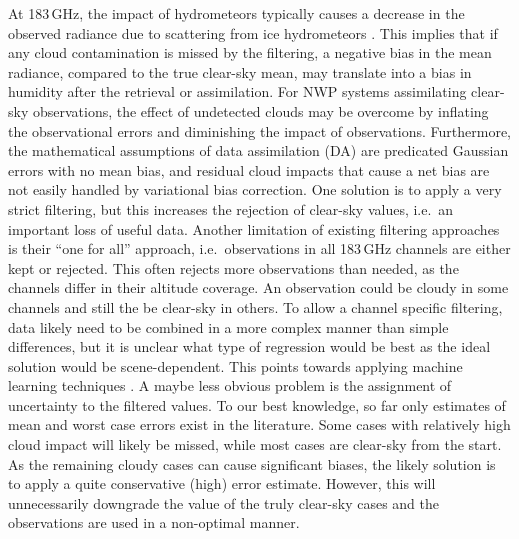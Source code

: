 \documentclass[amt, manuscript]{copernicus}
\begin{document}
At 183\,GHz, the impact of hydrometeors typically causes a decrease in the observed radiance due to scattering from ice hydrometeors \citep[e.g.,][]{barlakas:three:20}. This implies that if any cloud contamination is missed by the filtering, a negative bias in the mean radiance, compared to the true clear-sky mean, may translate into a bias in humidity after the retrieval or assimilation. For NWP systems assimilating clear-sky observations, the effect of undetected clouds may be overcome by inflating the observational errors and diminishing the impact of observations. Furthermore, the mathematical assumptions of data assimilation (DA) are predicated Gaussian errors with no mean bias, and residual cloud impacts that cause a net bias are not easily handled by variational bias correction. One solution is to apply a very strict filtering, but this increases the rejection of clear-sky values, i.e.\ an important loss of useful data. Another limitation of existing filtering approaches is their ``one for all'' approach, i.e.\ observations in all 183\,GHz channels are either kept or rejected. This often rejects more observations than needed, as the channels differ in their altitude coverage. An observation could be cloudy in some channels and still the be clear-sky in others. To allow a channel specific filtering, data likely need to be combined in a more complex manner than simple differences, but it is unclear what type of regression would be best as the ideal solution would be scene-dependent. This points towards applying machine learning techniques \citep[e.g.,][]{favrichon2019detecting}. A maybe less obvious problem is the assignment of uncertainty to the filtered values. To our best knowledge, so far only estimates of mean and worst case errors exist in the literature. Some cases with relatively high cloud impact will likely be missed, while most cases are clear-sky from the start. As the remaining cloudy cases can cause significant biases, the likely solution is to apply a quite conservative (high) error estimate. However, this will unnecessarily downgrade the value of the truly clear-sky cases and the observations are used in a non-optimal manner.
\end{document}

